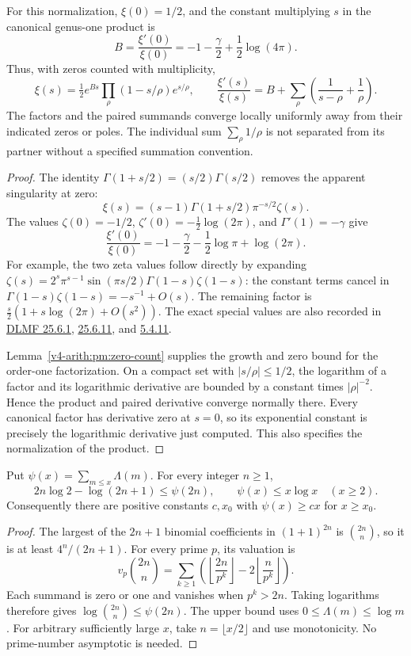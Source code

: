 \begin{proposition}
\label{v4-arith:pm:constant}
For this normalization, $\xi(0)=1/2$, and the constant multiplying
$s$ in the canonical genus-one product is
\[
 B=\frac{\xi'(0)}{\xi(0)}
   =-1-\frac\gamma2+\frac12\log(4\pi).
\]
Thus, with zeros counted with multiplicity,
\[
 \xi(s)=\tfrac12e^{Bs}\prod_\rho(1-s/\rho)e^{s/\rho},\qquad
 \frac{\xi'(s)}{\xi(s)}
   =B+\sum_\rho\left(\frac1{s-\rho}+\frac1\rho\right).
\]
The factors and the paired summands converge locally uniformly away
from their indicated zeros or poles. The individual sum
$\sum_\rho1/\rho$ is not separated from its partner without a
specified summation convention.
\end{proposition}
\begin{proof}
The identity $\Gamma(1+s/2)=(s/2)\Gamma(s/2)$ removes the apparent
singularity at zero:
\[
 \xi(s)=(s-1)\Gamma(1+s/2)\pi^{-s/2}\zeta(s).
\]
The values $\zeta(0)=-1/2$, $\zeta'(0)=-\tfrac12\log(2\pi)$,
and $\Gamma'(1)=-\gamma$ give
\[
 \frac{\xi'(0)}{\xi(0)}
 =-1-\frac\gamma2-\frac12\log\pi+\log(2\pi).
\]
For example, the two zeta values follow directly by expanding
$\zeta(s)=2^s\pi^{s-1}\sin(\pi s/2)\Gamma(1-s)\zeta(1-s)$:
the constant terms cancel in
$\Gamma(1-s)\zeta(1-s)=-s^{-1}+O(s)$.
The remaining factor is
$\tfrac s2(1+s\log(2\pi)+O(s^2))$.
The exact special values are also recorded in
\href{https://dlmf.nist.gov/25.6.E1}{DLMF 25.6.1},
\href{https://dlmf.nist.gov/25.6.E11}{25.6.11}, and
\href{https://dlmf.nist.gov/5.4.E11}{5.4.11}.

Lemma~\ref{v4-arith:pm:zero-count} supplies the growth and zero bound
for the order-one factorization. On a compact set with
$|s/\rho|\leq1/2$, the logarithm of a factor and its logarithmic
derivative are bounded by a constant times $|\rho|^{-2}$.
Hence the product and paired derivative converge normally there.
Every canonical factor has derivative zero at $s=0$, so its
exponential constant is precisely the logarithmic derivative just
computed. This also specifies the normalization of the product.
\end{proof}

\begin{lemma}
\label{v4-arith:pm:growth}
Put $\psi(x)=\sum_{m\leq x}\Lambda(m)$. For every integer $n\geq1$,
\[
 2n\log2-\log(2n+1)\leq\psi(2n),
 \qquad \psi(x)\leq x\log x\quad(x\geq2).
\]
Consequently there are positive constants $c,x_0$ with
$\psi(x)\geq cx$ for $x\geq x_0$.
\end{lemma}
\begin{proof}
The largest of the $2n+1$ binomial coefficients in $(1+1)^{2n}$
is $\binom{2n}{n}$, so it is at least $4^n/(2n+1)$.
For every prime $p$, its valuation is
\[
 v_p\binom{2n}{n}
 =\sum_{k\geq1}\left(\left\lfloor\frac{2n}{p^k}\right\rfloor
                 -2\left\lfloor\frac n{p^k}\right\rfloor\right).
\]
Each summand is zero or one and vanishes when $p^k>2n$.
Taking logarithms therefore gives
$\log\binom{2n}{n}\leq\psi(2n)$.
The upper bound uses $0\leq\Lambda(m)\leq\log m$.
For arbitrary sufficiently large $x$, take $n=\lfloor x/2\rfloor$
and use monotonicity. No prime-number asymptotic is needed.
\end{proof}

